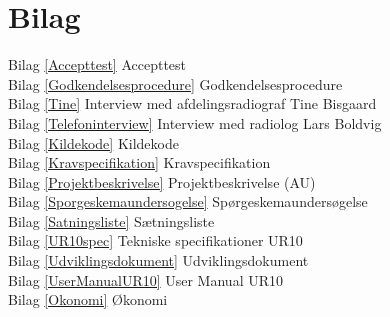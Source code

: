 \chapter{Bilag}\label{kapitel_Bilag}

Bilag \ref{Accepttest} Accepttest \\
Bilag \ref{Godkendelsesprocedure} Godkendelsesprocedure \\
Bilag \ref{Tine} Interview med afdelingsradiograf Tine Bisgaard \\
Bilag \ref{Telefoninterview} Interview med radiolog Lars Boldvig \\
Bilag \ref{Kildekode} Kildekode \\
Bilag \ref{Kravspecifikation} Kravspecifikation \\
Bilag \ref{Projektbeskrivelse} Projektbeskrivelse (AU) \\
Bilag \ref{Sporgeskemaundersogelse} Spørgeskemaundersøgelse\\
Bilag \ref{Satningsliste} Sætningsliste \\
Bilag \ref{UR10spec} Tekniske specifikationer UR10 \\
Bilag \ref{Udviklingsdokument} Udviklingsdokument \\
Bilag \ref{UserManualUR10} User Manual UR10 \\
Bilag \ref{Okonomi} Økonomi \\



